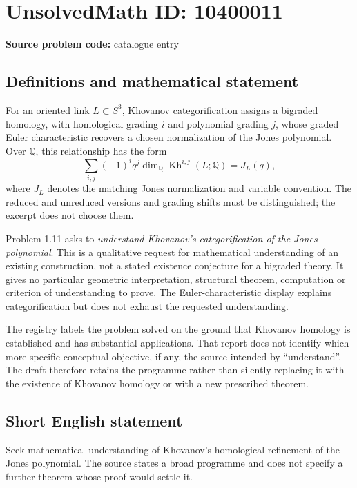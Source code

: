 \documentclass[11pt]{article}
\newcommand{\Q}{\mathbb{Q}}
\begin{document}
\section*{UnsolvedMath ID: 10400011}
\textbf{Source problem code:} catalogue entry
\subsection{Definitions and mathematical statement}
For an oriented link \(L\subset S^3\), Khovanov categorification assigns a bigraded homology, with homological grading \(i\) and polynomial grading \(j\), whose graded Euler characteristic recovers a chosen normalization of the Jones polynomial. Over \(\Q\), this relationship has the form
\[
 \sum_{i,j}(-1)^i q^j\dim_\Q\operatorname{Kh}^{i,j}(L;\Q)=J_L(q),
\]
where \(J_L\) denotes the matching Jones normalization and variable convention. The reduced and unreduced versions and grading shifts must be distinguished; the excerpt does not choose them.

Problem 1.11 asks to \emph{understand Khovanov's categorification of the Jones polynomial}. This is a qualitative request for mathematical understanding of an existing construction, not a stated existence conjecture for a bigraded theory. It gives no particular geometric interpretation, structural theorem, computation or criterion of understanding to prove. The Euler-characteristic display explains categorification but does not exhaust the requested understanding.

The registry labels the problem solved on the ground that Khovanov homology is established and has substantial applications. That report does not identify which more specific conceptual objective, if any, the source intended by ``understand''. The draft therefore retains the programme rather than silently replacing it with the existence of Khovanov homology or with a new prescribed theorem.
\subsection{Short English statement}
Seek mathematical understanding of Khovanov's homological refinement of the Jones polynomial. The source states a broad programme and does not specify a further theorem whose proof would settle it.
\end{document}
